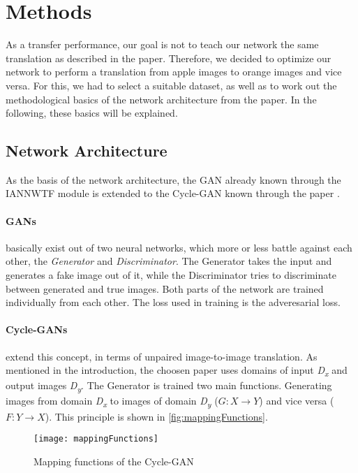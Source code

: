 \documentclass[fleqn,10pt]{SelfArx} %
\begin{document}
\section{Methods}

As a transfer performance, our goal is not to teach our network the same translation as described in the paper.  Therefore, we decided to optimize our network to perform a translation from apple images to orange images and vice versa. For this, we had to select a suitable dataset, as well as to work out the methodological basics of the network architecture from the paper. In the following, these basics will be explained.

\subsection{Network Architecture}
As the basis of the network architecture, the \ac{GAN} already known through the \ac{IANNWTF} module is extended to the Cycle-\ac{GAN} known through the paper \cite{image-to-image-ccan}.

\paragraph{\acl{GAN}s} basically exist out of two neural networks, which more or less battle against each other, the \textit{Generator} and \textit{Discriminator}. The Generator takes the input and generates a fake image out of it, while the Discriminator tries to discriminate between generated and true images. Both parts of the network are trained individually from each other. The loss used in training is the adveresarial loss.~\cite{Introduction-to-Cycle-GANs, GAN-Courseware}

\paragraph{Cycle-\ac{GAN}s} extend this concept, in terms of unpaired image-to-image translation. As mentioned in the introduction, the choosen paper uses domains of input \textit{D\textsubscript{x}} and output images \textit{D\textsubscript{y}}. The Generator is trained two main functions. Generating images from domain \textit{D\textsubscript{x}} to images of domain \textit{D\textsubscript{y}} ($G: X \rightarrow Y$) and vice versa ($F: Y \rightarrow X$). This principle is shown in \autoref{fig:mappingFunctions}.~\cite{image-to-image-ccan}

\begin{figure} \centering 
	\texttt{[image: mappingFunctions]}
	\caption{Mapping functions of the Cycle-\ac{GAN}~\cite{image-to-image-ccan}}
	\label{fig:mappingFunctions}
\end{figure}
\end{document}
